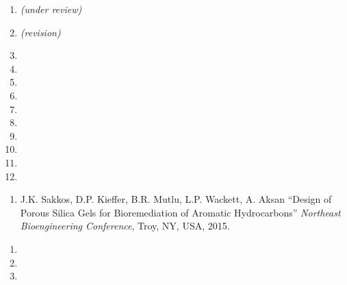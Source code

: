 \documentclass[11pt, letterpaper]{awesome-cv} %
\begin{document}
\begin{sloppypar}
\begin{cvparagraph}
	\begin{enumerate}
		\item{ \textit{(under review)}}
		\item{ \textit{(revision)}}
		\item{}
		\item {}
		\item{}
		\item{}
		\item{}
		\item{}
		\item{}
		\item{}
		\item{}
		\item{}
		
	\end{enumerate}
\end{cvparagraph}
\begin{cvparagraph}
	\begin{enumerate}
		
		\item {J.K. Sakkos, D.P. Kieffer, B.R. Mutlu, L.P. Wackett, A. Aksan “Design of Porous Silica Gels for Bioremediation of Aromatic Hydrocarbons” \textit{Northeast Bioengineering Conference}, Troy, NY, USA, 2015.}
	\end{enumerate}
\end{cvparagraph}
\begin{cvparagraph}
	\begin{enumerate}
		\item{}
		\item{}
		\item{}
		
	\end{enumerate}
\end{cvparagraph}


\end{sloppypar}
\end{document}
